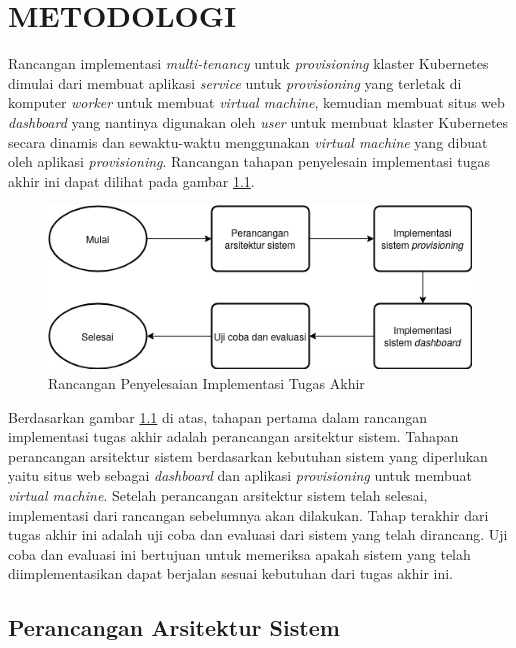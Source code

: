 \chapter{METODOLOGI}
\label{chap:metodologi}

Rancangan implementasi \emph{multi-tenancy} untuk \emph{provisioning}
klaster Kubernetes dimulai dari membuat aplikasi \emph{service} untuk \emph{provisioning}
yang terletak di komputer \emph{worker} untuk membuat
\emph{virtual machine}, kemudian membuat situs web \emph{dashboard} yang nantinya
digunakan oleh \emph{user} untuk membuat klaster Kubernetes secara dinamis dan sewaktu-waktu
menggunakan \emph{virtual machine} yang dibuat oleh aplikasi \emph{provisioning}.
Rancangan tahapan penyelesain implementasi tugas akhir ini
dapat dilihat pada gambar \ref{fig:top-level-implementation}.

\begin{figure}[H]
  \centering
  \includegraphics[scale=0.6]{gambar/top-level-implementation.png}
  \caption{Rancangan Penyelesaian Implementasi Tugas Akhir}
  \label{fig:top-level-implementation}
\end{figure}

Berdasarkan gambar \ref{fig:top-level-implementation} di atas, tahapan pertama
dalam rancangan implementasi tugas akhir adalah perancangan arsitektur sistem.
Tahapan perancangan arsitektur sistem berdasarkan kebutuhan sistem yang diperlukan
yaitu situs web sebagai \emph{dashboard} dan aplikasi \emph{provisioning}
untuk membuat \emph{virtual machine}. Setelah perancangan arsitektur sistem telah
selesai, implementasi dari rancangan sebelumnya akan dilakukan. Tahap terakhir
dari tugas akhir ini adalah uji coba dan evaluasi dari sistem yang telah dirancang.
Uji coba dan evaluasi ini bertujuan untuk memeriksa apakah sistem yang telah
diimplementasikan dapat berjalan sesuai kebutuhan dari tugas akhir ini.

\section{Perancangan Arsitektur Sistem}
\label{sec:perancanganarsitektursistem}

